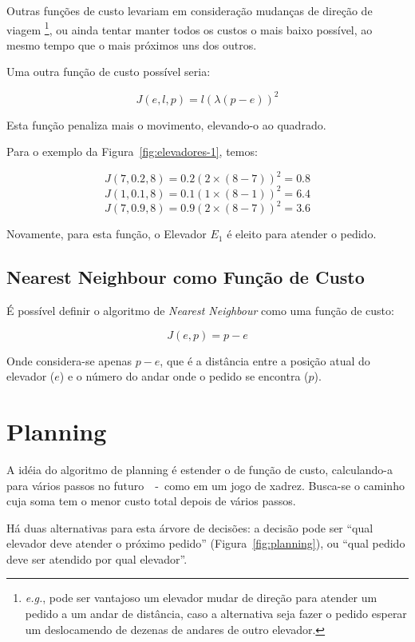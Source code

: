 Outras funções de custo levariam em consideração mudanças de direção de viagem
\footnote{\textit{e.g.}, pode ser vantajoso um elevador mudar de direção para atender um
pedido a um andar de distância, caso a alternativa seja fazer o pedido esperar
um deslocamendo de dezenas de andares de outro elevador.}, ou ainda tentar
manter todos os custos o mais baixo possível, ao mesmo tempo que o mais
próximos uns dos outros.

Uma outra função de custo possível seria:

\[J(e, l, p) = l(\lambda(p - e))^{2}\]

Esta função penaliza mais o movimento, elevando-o ao quadrado.

Para o exemplo da Figura~\ref{fig:elevadores-1}, temos:

\[J(7, 0.2, 8) = 0.2(2 \times (8-7))^2 = 0.8\]
\[J(1, 0.1, 8) = 0.1(1 \times (8-1))^2 = 6.4\]
\[J(7, 0.9, 8) = 0.9(2 \times (8-7))^2 = 3.6\]

Novamente, para esta função, o Elevador $E_{1}$ é eleito para atender o pedido.

\subsection{Nearest Neighbour como Função de Custo}

É possível definir o algoritmo de \textit{Nearest Neighbour} como uma função de
custo:

\[J(e, p) = p - e\]

Onde considera-se apenas $p - e$, que é a distância entre a posição atual do
elevador ($e$) e o número do andar onde o pedido se encontra ($p$).

\section{Planning}


A idéia do algoritmo de planning é estender o de função de custo, calculando-a
para vários passos no futuro~\cite{Koehler00elevatorcontrol}~-~como em um jogo de xadrez. Busca-se o
caminho cuja soma tem o menor custo total depois de vários passos.

Há duas alternativas para esta árvore de decisões: a decisão pode ser ``qual
elevador deve atender o próximo pedido'' (Figura~\ref{fig:planning}),
ou ``qual pedido deve ser atendido por qual elevador''. %


